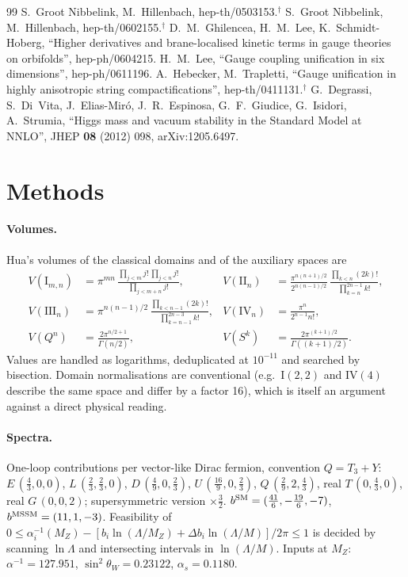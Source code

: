 \documentclass[11pt,a4paper]{article}
\newcommand{\ainv}{\alpha^{-1}}
\begin{document}
\begin{thebibliography}{99}
 S.~Groot Nibbelink, M.~Hillenbach, hep-th/0503153.$^\dagger$
 S.~Groot Nibbelink, M.~Hillenbach, hep-th/0602155.$^\dagger$
 D.~M.~Ghilencea, H.~M.~Lee, K.~Schmidt-Hoberg, ``Higher derivatives and brane-localised kinetic terms in gauge theories on orbifolds'', hep-ph/0604215.
 H.~M.~Lee, ``Gauge coupling unification in six dimensions'', hep-ph/0611196.
 A.~Hebecker, M.~Trapletti, ``Gauge unification in highly anisotropic string compactifications'', hep-th/0411131.$^\dagger$
 G.~Degrassi, S.~Di~Vita, J.~Elias-Mir\'o, J.~R.~Espinosa, G.~F.~Giudice, G.~Isidori, A.~Strumia, ``Higgs mass and vacuum stability in the Standard Model at NNLO'', JHEP \textbf{08} (2012) 098, arXiv:1205.6497.
\end{thebibliography}

\appendix
\section{Methods}
\paragraph{Volumes.} Hua's volumes of the classical domains and of the auxiliary spaces are
\begin{align*}
V(\mathrm{I}_{m,n})&=\pi^{mn}\,\frac{\prod_{j<m}j!\,\prod_{j<n}j!}{\prod_{j<m+n}j!}, &
V(\mathrm{II}_n)&=\frac{\pi^{n(n+1)/2}}{2^{n(n-1)/2}}\,\frac{\prod_{k<n}(2k)!}{\prod_{k=n}^{2n-1}k!},\\
V(\mathrm{III}_n)&=\pi^{n(n-1)/2}\,\frac{\prod_{k<n-1}(2k)!}{\prod_{k=n-1}^{2n-3}k!}, &
V(\mathrm{IV}_n)&=\frac{\pi^n}{2^{n-1}n!},\\
V(Q^n)&=\frac{2\pi^{n/2+1}}{\Gamma(n/2)}, & V(S^k)&=\frac{2\pi^{(k+1)/2}}{\Gamma((k+1)/2)} .
\end{align*}
Values are handled as
logarithms, deduplicated at $10^{-11}$ and searched by bisection. Domain normalisations are conventional (e.g.\ I$(2,2)$ and IV$(4)$
describe the same space and differ by a factor 16), which is itself an argument against a direct physical reading.

\paragraph{Spectra.} One-loop contributions per vector-like Dirac fermion, convention $Q=T_3+Y$: $E\,(\tfrac43,0,0)$, $L\,(\tfrac23,\tfrac23,0)$,
$D\,(\tfrac49,0,\tfrac23)$, $U\,(\tfrac{16}9,0,\tfrac23)$, $Q\,(\tfrac29,2,\tfrac43)$, real $T\,(0,\tfrac43,0)$, real $G\,(0,0,2)$; supersymmetric
version $\times\tfrac32$. $b^{\rm SM}=(\tfrac{41}6,-\tfrac{19}6,-7)$, $b^{\rm MSSM}=(11,1,-3)$. Feasibility of
$0\le\ainv_i(M_Z)-[b_i\ln(\Lambda/M_Z)+\Delta b_i\ln(\Lambda/M)]/2\pi\le1$ is decided by scanning $\ln\Lambda$ and intersecting intervals in
$\ln(\Lambda/M)$. Inputs at $M_Z$: $\ainv=127.951$, $\sin^2\theta_W=0.23122$, $\alpha_s=0.1180$.
\end{document}
